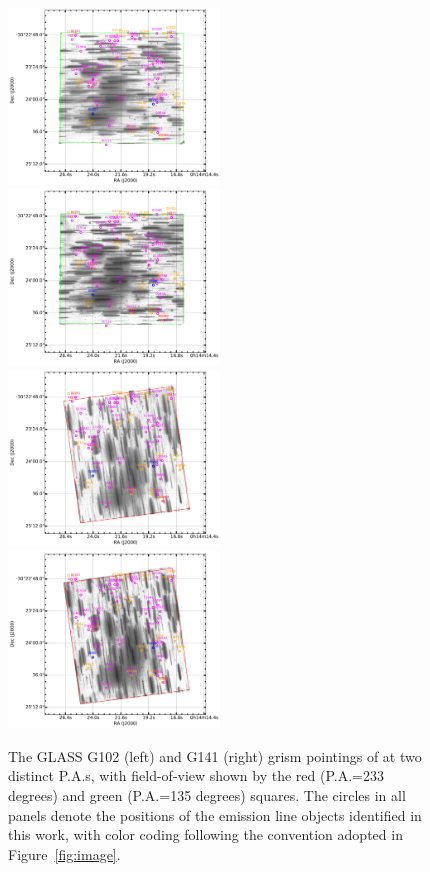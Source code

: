 \begin{figure}
    \includegraphics[width=0.5\textwidth]{fig/A2744_RGB_A2744-135-141027-G102_drz_final.pdf}
    \includegraphics[width=0.5\textwidth]{fig/A2744_RGB_A2744-135-141027-G141_drz_final.pdf}\\
    \includegraphics[width=0.5\textwidth]{fig/A2744_RGB_A2744-233-141027-G102_drz_final.pdf}
    \includegraphics[width=0.5\textwidth]{fig/A2744_RGB_A2744-233-141027-G141_drz_final.pdf}
    \caption[The GLASS G102 and G141 grism pointings of \cler at two distinct P.A.s.]{The GLASS G102 (left) and G141 (right) grism pointings of \cler at two distinct P.A.s, with field-of-view shown by the 
red (P.A.=233 degrees) and green (P.A.=135 degrees) squares. The circles in all panels denote the positions of the emission line 
objects identified in this work, with color coding following the convention adopted in Figure~\ref{fig:image}.}
\label{fig:grisms}
\end{figure}
